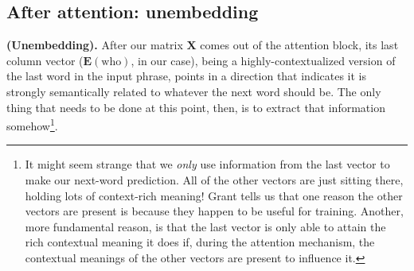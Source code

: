 \documentclass{article}
\begin{document}
\subsection*{After attention: unembedding}

\textbf{(Unembedding).} After our matrix $\mathbf{X}$ comes out of the attention block, its last column vector ($\mathbf{E}(\text{who})$, in our case), being a highly-contextualized version of the last word in the input phrase, points in a direction that indicates it is strongly semantically related to whatever the next word should be. The only thing that needs to be done at this point, then, is to extract that information somehow\footnote{It might seem strange that we \textit{only} use information from the last vector to make our next-word prediction. All of the other vectors are just sitting there, holding lots of context-rich meaning! Grant tells us that one reason the other vectors are present is because they happen to be useful for training. Another, more fundamental reason, is that the last vector is only able to attain the rich contextual meaning it does if, during the attention mechanism, the contextual meanings of the other vectors are present to influence it.}.
\end{document}
